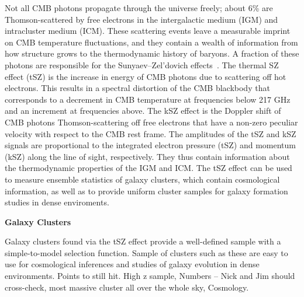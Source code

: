 \documentclass[PICOReport.tex]{subfiles}
\begin{document}
Not all CMB photons propagate through the universe freely; about 6\% are Thomson-scattered by free electrons in the intergalactic medium (IGM) and intracluster medium (ICM). These scattering events leave a measurable imprint on CMB temperature fluctuations, and they contain a wealth of information from how structure grows to the thermodynamic history of baryons. A fraction of these photons are responsible for the Sunyaev--Zel'dovich effects~\citep{SZ1969,SZ1972}. The thermal SZ effect (tSZ) is the increase in energy of CMB photons due to scattering off hot electrons. This results in a spectral distortion
 of the CMB blackbody that corresponds to a decrement in CMB temperature at frequencies below 217 GHz and an increment at frequencies above. The kSZ effect is the Doppler shift of CMB photons Thomson-scattering off free electrons that have a non-zero peculiar velocity with respect to the CMB rest frame. 
The amplitudes of the tSZ and kSZ signals are proportional to the integrated electron pressure (tSZ) and momentum (kSZ) along the line of sight, respectively.  They thus contain information about the thermodynamic properties of the IGM and ICM.
The tSZ effect can be used to measure ensemble statistics of galaxy clusters, which contain cosmological information, as well as to provide uniform cluster samples for galaxy formation studies in dense enviroments.
%

{\bf Galaxy Clusters}


Galaxy clusters found via the tSZ  effect provide a well-defined sample with a simple-to-model selection function. Sample of clusters such as these are easy to use for cosmological inferences and studies of galaxy evolution in dense environments. 
Points to still hit.
High z sample,
Numbers -- Nick and Jim should cross-check,
most massive cluster all over the whole sky,
Cosmology.
\end{document}
